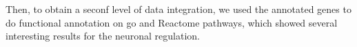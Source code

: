 Then, to obtain a seconf level of data integration, we used the annotated genes to do functional annotation on \gls{go} \cite{GeneOntologyConsortium2004, GeneOntologyConsortium2015} and Reactome pathways, which showed several interesting results for the neuronal regulation.








